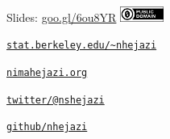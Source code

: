 \documentclass[12pt,t]{beamer}
\begin{document}
\begin{frame}[c]{}

\Large
Slides: \href{https://goo.gl/6ou8YR}{goo.gl/6ou8YR} \quad
\includegraphics[height=5mm]{Figs/cc-zero.png}

\vspace{10mm}

\href{https://www.stat.berkeley.edu/~nhejazi}{\tt stat.berkeley.edu/\textasciitilde{}nhejazi}

\vspace{10mm}

\href{http://nimahejazi.org}{\tt nimahejazi.org}

\vspace{10mm}

\href{https://twitter.com/nshejazi}{\tt twitter/@nshejazi}

\vspace{10mm}

\href{https://github.com/nhejazi}{\tt github/nhejazi}


\end{frame}
\end{document}
